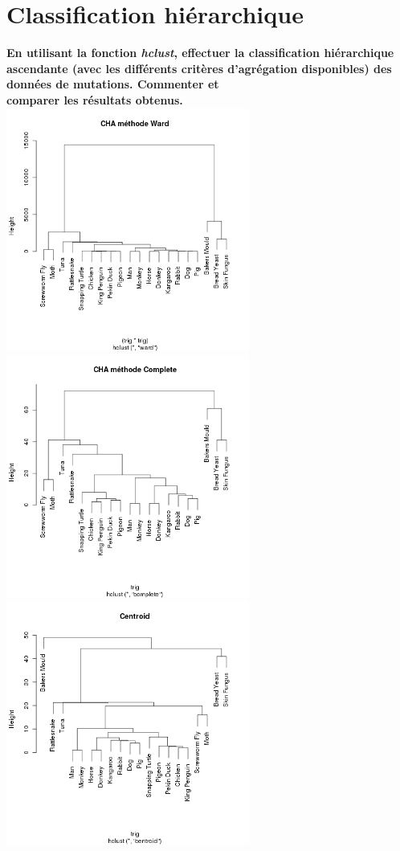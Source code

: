\documentclass[a4paper, 10pt]{article}
\begin{document}
\section{Classification hi\'erarchique}
\textbf{En utilisant la fonction \textit{hclust}, effectuer la classification hi\'erarchique ascendante
(avec les diff\'erents crit\`eres d'agr\'egation disponibles) des donn\'ees de mutations.
Commenter et\\comparer les r\'esultats obtenus.}\\
\includegraphics[height = 8cm, width = 8cm]{plots/plot_ward_1.png}
\includegraphics[height = 8cm, width = 8cm]{plots/plot_complete_1.png}\\
\includegraphics[height = 8cm, width = 8cm]{plots/plot_centroid_1.png}
\end{document}
